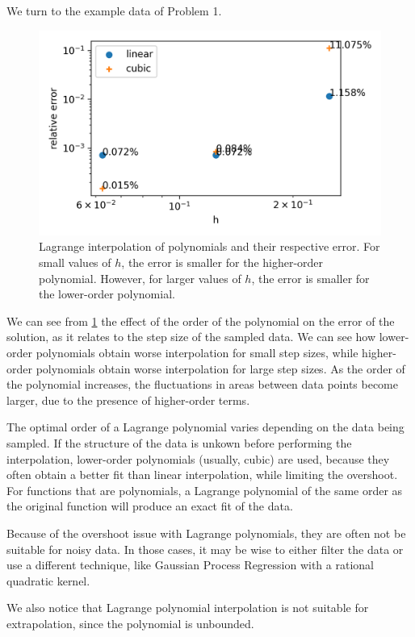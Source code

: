\documentclass[10pt,letterpaper]{article}
\begin{document}
    We turn to the example data of Problem 1.
    \begin{figure}[h]
        \centering
        \includegraphics[width=0.9\linewidth]{../plots/lagrange_error.png}
        \caption{Lagrange interpolation of polynomials and their respective error. For small values of $h$, the error is smaller for the higher-order polynomial. However, for larger values of $h$, the error is smaller for the lower-order polynomial.}
        \label{fig:lagrange_error}
    \end{figure}
    We can see from \cref{fig:lagrange_error} the effect of the order of the polynomial on the error of the solution, as it relates to the step size of the sampled data. We can see how lower-order polynomials obtain worse interpolation for small step sizes, while higher-order polynomials obtain worse interpolation for large step sizes. As the order of the polynomial increases, the fluctuations in areas between data points become larger, due to the presence of higher-order terms.

    The optimal order of a Lagrange polynomial varies depending on the data being sampled. If the structure of the data is unkown before performing the interpolation, lower-order polynomials (usually, cubic) are used, because they often obtain a better fit than linear interpolation, while limiting the overshoot. For functions that are polynomials, a Lagrange polynomial of the same order as the original function will produce an exact fit of the data.

    Because of the overshoot issue with Lagrange polynomials, they are often not be suitable for noisy data. In those cases, it may be wise to either filter the data or use a different technique, like Gaussian Process Regression with a rational quadratic kernel.

    We also notice that Lagrange polynomial interpolation is not suitable for extrapolation, since the polynomial is unbounded.
\end{document}
